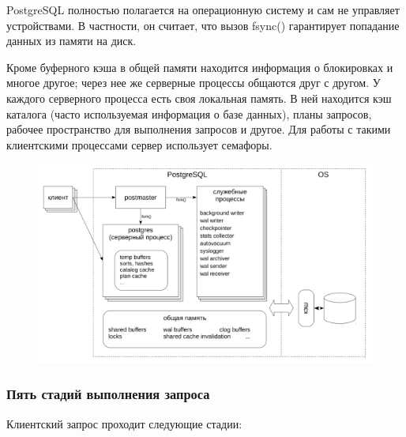 PostgreSQL полностью полагается на операционную систему и сам не
управляет устройствами. В частности, он считает, что вызов fsync()
гарантирует попадание данных из
памяти на диск.

Кроме буферного кэша в общей памяти находится информация о
блокировках и многое
другое; через нее же серверные процессы общаются друг с другом. У
каждого серверного
процесса есть своя локальная память. В ней находится кэш каталога (часто
используемая
информация о базе данных), планы запросов, рабочее пространство для
выполнения запросов и другое. Для работы с такими клиентскими
процессами сервер использует семафоры.

\begin{figure}[ht!]
	\centering
	\includegraphics[width=18cm, keepaspectratio]{assets/plan-1.png}
	\caption{} 
\end{figure}
\FloatBarrier

\subsubsection{Пять стадий выполнения запроса}

Клиентский запрос проходит следующие стадии:

